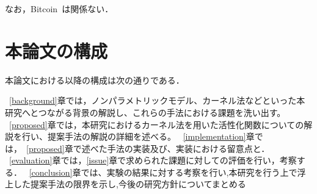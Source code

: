 なお，Bitcoin~\cite{Bitcoin}は関係ない．

\section{本論文の構成}

本論文における以降の構成は次の通りである．

~\ref{background}章では，ノンパラメトリックモデル、カーネル法などといった本研究へとつながる背景の解説し、これらの手法における課題を洗い出す。
~\ref{proposed}章では，本研究におけるカーネル法を用いた活性化関数についての解説を行い、提案手法の解説の詳細を述べる。
~\ref{implementation}章では，~\ref{proposed}章で述べた手法の実装及び、実装における留意点と．
~\ref{evaluation}章では，\ref{issue}章で求められた課題に対しての評価を行い，考察する．
~\ref{conclusion}章では、実験の結果に対する考察を行い,本研究を行う上で浮上した提案手法の限界を示し,今後の研究方針についてまとめる






